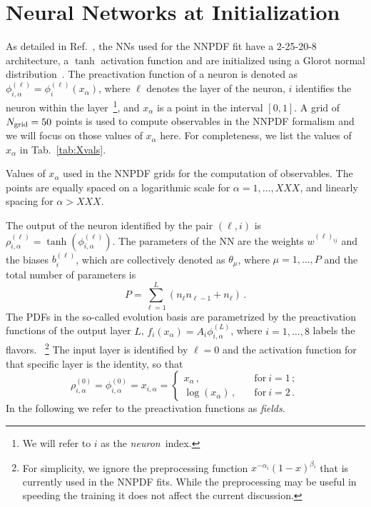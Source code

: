 \documentclass[11pt]{article}
\begin{document}
\section{Neural Networks at Initialization}
\label{sec:Init}

As detailed in Ref.~\cite{NNPDF:2021njg}, the NNs used for the NNPDF fit have a 2-25-20-8 architecture, 
a $\tanh$ activation function 
and are initialized using a Glorot normal distribution~\cite{glorot2010understanding}. The preactivation
function of a neuron is denoted as $\phi^{(\ell)}_{i,\alpha} = \phi^{(\ell)}_i(x_\alpha)$, where $\ell$
denotes the layer of the neuron, $i$ identifies the neuron within the layer~\footnote{We will refer 
to $i$ as the {\em neuron}\ index.}, and $x_{\alpha}$ is a point in the interval $[0,1]$. 
A grid of $N_{\mathrm{grid}}=50$ points is used to compute observables in the NNPDF formalism and we will focus 
on those values of $x_\alpha$ here. For completeness, we list the values of $x_\alpha$ in 
Tab.~\ref{tab:Xvals}. 

\begin{table}[ht]
    \caption{Values of $x_\alpha$ used in the NNPDF grids for the computation of 
    observables. The points are equally spaced on a logarithmic scale 
    for $\alpha = 1, \ldots, XXX$, and linearly spacing for $\alpha > XXX$.
    \label{tab:Xvals}}    
\end{table}

The output of the neuron identified by the pair $(\ell,i)$ is 
$\rho^{(\ell)}_{i,\alpha} = \tanh\left(\phi^{(\ell)}_{i,\alpha}\right)$. 
The parameters of the NN are the weights $w^{(\ell)_{ij}}$ and the biases $b^{(\ell)}_i$, which are
collectively denoted as $\theta_\mu$, where $\mu = 1, \ldots, P$ and the total number of parameters 
is
\begin{equation}
    \label{eq:TotPar}
    P = \sum_{\ell=1}^{L} \left(n_{\ell} n_{\ell-1} + n_\ell\right)\, .
\end{equation}
The PDFs in the 
so-called evolution basis are parametrized by the preactivation functions of the output layer $L$, 
$f_i(x_\alpha)=A_i \phi^{(L)}_{i,\alpha}$, where $i=1, \ldots, 8$ labels the flavors.
~\footnote{For simplicity, we ignore the preprocessing function $x^{-\alpha_i} (1-x)^{\beta_i}$ that 
is currently used in the NNPDF fits. While the preprocessing may be useful in speeding the training
it does not affect the current discussion.} 
The input layer is identified by $\ell=0$ and the activation 
function for that specific layer is the identity, so that 
\begin{equation}
    \label{eq:InitLayerPhi}
    \rho^{(0)}_{i,\alpha} = \phi^{(0)}_{i,\alpha} = x_{i,\alpha} = 
    \begin{cases}
        x_\alpha\, , \quad &\text{for}\ i=1\, ;\\
        \log\left(x_\alpha\right)\, , \quad &\text{for}\ i=2\, .
    \end{cases}
\end{equation}
In the following we refer to the preactivation functions as {\em fields}.
\end{document}
